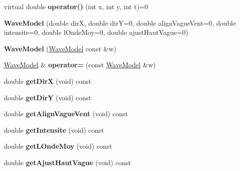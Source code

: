 \begin{DoxyCompactItemize}
\item 
\hypertarget{class_wave_model_a889a450cd0249533c42481818121cb88}{}\label{class_wave_model_a889a450cd0249533c42481818121cb88} 
virtual double {\bfseries operator()} (int x, int y, int t)=0
\item 
\hypertarget{class_wave_model_a4fe96b7c5d499212f104d576c1623e55}{}\label{class_wave_model_a4fe96b7c5d499212f104d576c1623e55} 
{\bfseries Wave\+Model} (double dirX, double dirY=0, double align\+Vague\+Vent=0, double intensite=0, double l\+Onde\+Moy=0, double ajust\+Haut\+Vague=0)
\item 
\hypertarget{class_wave_model_a25791da686d3d80e605ec2d5119a0a77}{}\label{class_wave_model_a25791da686d3d80e605ec2d5119a0a77} 
{\bfseries Wave\+Model} (\hyperlink{class_wave_model}{Wave\+Model} const \&w)
\item 
\hypertarget{class_wave_model_acbbb099975edc7b7ef03b23deb67bd68}{}\label{class_wave_model_acbbb099975edc7b7ef03b23deb67bd68} 
\hyperlink{class_wave_model}{Wave\+Model} \& {\bfseries operator=} (const \hyperlink{class_wave_model}{Wave\+Model} \&w)
\item 
\hypertarget{class_wave_model_a5ab74b10cb5573a3c2fe6fcb2820e9ba}{}\label{class_wave_model_a5ab74b10cb5573a3c2fe6fcb2820e9ba} 
double {\bfseries get\+DirX} (void) const
\item 
\hypertarget{class_wave_model_aba929e2efa38f19639a645ec085a01d3}{}\label{class_wave_model_aba929e2efa38f19639a645ec085a01d3} 
double {\bfseries get\+DirY} (void) const
\item 
\hypertarget{class_wave_model_a3e04992c8898eed9ad112d273e432787}{}\label{class_wave_model_a3e04992c8898eed9ad112d273e432787} 
double {\bfseries get\+Align\+Vague\+Vent} (void) const
\item 
\hypertarget{class_wave_model_ac93f79a9ccb22f5d57cd7bbe543fa728}{}\label{class_wave_model_ac93f79a9ccb22f5d57cd7bbe543fa728} 
double {\bfseries get\+Intensite} (void) const
\item 
\hypertarget{class_wave_model_a4e9e1d1a5be89413beea6ae8c72adc39}{}\label{class_wave_model_a4e9e1d1a5be89413beea6ae8c72adc39} 
double {\bfseries get\+L\+Onde\+Moy} (void) const
\item 
\hypertarget{class_wave_model_a24d40f4090721841f2e7b1b1a329f2c8}{}\label{class_wave_model_a24d40f4090721841f2e7b1b1a329f2c8} 
double {\bfseries get\+Ajust\+Haut\+Vague} (void) const
\end{DoxyCompactItemize}
